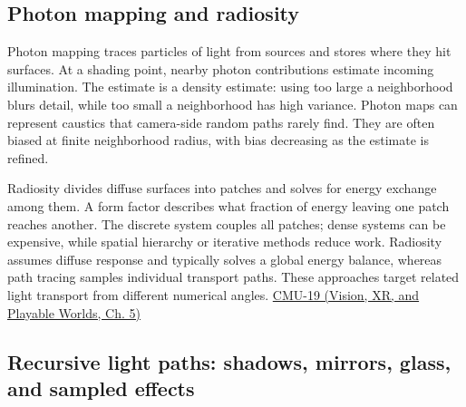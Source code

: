 \subsection{Photon mapping and radiosity}\label{03-visual-computing-i-ch011-photon-mapping-and-radiosity}

\hypertarget{03-visual-computing-i-ch011-photon-mapping-and-radiosity}{}

Photon mapping traces particles of light from sources and stores where they hit surfaces. At a shading point, nearby photon contributions estimate incoming illumination. The estimate is a density estimate: using too large a neighborhood blurs detail, while too small a neighborhood has high variance. Photon maps can represent caustics that camera-side random paths rarely find. They are often biased at finite neighborhood radius, with bias decreasing as the estimate is refined.

Radiosity divides diffuse surfaces into patches and solves for energy exchange among them. A form factor describes what fraction of energy leaving one patch reaches another. The discrete system couples all patches; dense systems can be expensive, while spatial hierarchy or iterative methods reduce work. Radiosity assumes diffuse response and typically solves a global energy balance, whereas path tracing samples individual transport paths. These approaches target related light transport from different numerical angles. \href{../07-Vision-XR-and-Playable-Worlds/main.pdf\#nameddest=04-visual-computing-ii-ch036-cmu-19---variance-reduction}{CMU-19 (Vision, XR, and Playable Worlds, Ch. 5)}

\subsection{Recursive light paths: shadows, mirrors, glass, and sampled effects}\label{03-visual-computing-i-ch011-recursive-light-paths-shadows-mirrors-glass-and-sampled-effects}

\hypertarget{03-visual-computing-i-ch011-recursive-light-paths-shadows-mirrors-glass-and-sampled-effects}{}

